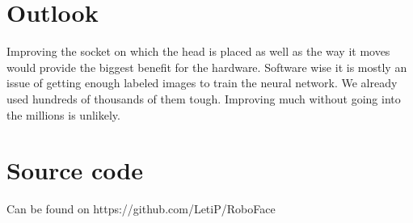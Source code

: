 \documentclass[12.5pt]{scrartcl}
\begin{document}
	\section{Outlook}
	Improving the socket on which the head is placed as well as the way it moves would provide the biggest benefit for the hardware.
    Software wise it is mostly an issue of getting enough labeled images to train the neural network. We already used hundreds of thousands of them tough.
    Improving much without going into the millions is unlikely.
	\section{Source code}
	Can be found on	https://github.com/LetiP/RoboFace
	
\end{document}
